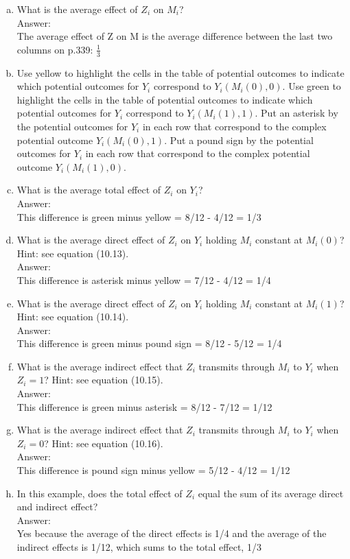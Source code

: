 \documentclass[11pt,notitlepage]{article}\usepackage[]{graphicx}\usepackage[]{color}
\begin{document}
\begin{enumerate}[a)]

\item What is the average effect of $Z_i$ on $M_i$? \\
Answer:\\
The average effect of Z on M is the average difference between the last two columns on p.339: $\frac{1}{3}$

\item Use yellow to highlight the cells in the table of potential outcomes to indicate which potential outcomes for $Y_i$ correspond to $Y_i(M_i(0), 0)$. Use green to highlight the cells in the table of potential outcomes to indicate which potential outcomes for $Y_i$ correspond to $Y_i(M_i(1), 1)$. Put an asterisk by the potential outcomes for $Y_i$ in each row that correspond to the complex potential outcome $Y_i(M_i(0), 1)$. Put a pound sign by the potential outcomes for $Y_i$ in each row that correspond to the complex potential outcome $Y_i(M_i(1), 0)$.

\item What is the average total effect of $Z_i$ on $Y_i$?\\
Answer:\\
This difference is green minus yellow = 8/12 - 4/12 = 1/3
\item What is the average direct effect of $Z_i$ on $Y_i$ holding $M_i$ constant at $M_i(0)$? Hint: see
equation (10.13).\\
Answer:\\
This difference is asterisk minus yellow = 7/12 - 4/12 = 1/4
\item What is the average direct effect of $Z_i$ on $Y_i$ holding $M_i$ constant at $M_i(1)$? Hint: see
equation (10.14).\\
Answer:\\
This difference is green minus pound sign = 8/12 - 5/12 = 1/4
\item What is the average indirect effect that $Z_i$ transmits through $M_i$ to $Y_i$ when $Z_i = 1$? Hint: see equation (10.15).\\
Answer:\\
This difference is green minus asterisk = 8/12 - 7/12 = 1/12
\item What is the average indirect effect that $Z_i$ transmits through $M_i$ to $Y_i$ when $Z_i = 0$? Hint: see equation (10.16).\\
Answer:\\
This difference is pound sign minus yellow = 5/12 - 4/12 = 1/12
\item In this example, does the total effect of $Z_i$ equal the sum of its average direct and indirect effect?\\
Answer:\\
Yes because the average of the direct effects is 1/4 and the average of the indirect effects is 1/12, which sums to the total effect, 1/3


\end{enumerate}
\end{document}
